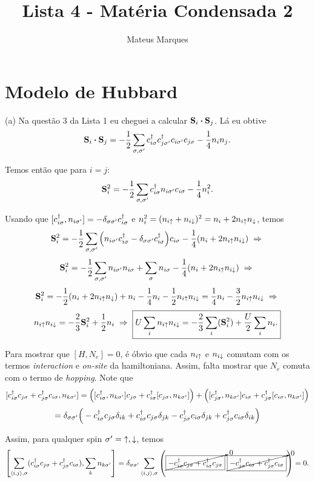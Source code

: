 \documentclass[a4paper,10pt]{article}
\title{\Huge{\textbf{Lista 4 - Matéria Condensada 2}}}
\author{Mateus Marques}
\begin{document}
\maketitle

\section{Modelo de Hubbard}

(a) Na questão 3 da Lista 1 eu cheguei a calcular $\S_i \vdot \S_j$. Lá eu obtive
$$
\S_i \vdot \S_j = -\frac{1}{2} \sum_{\s, \s'} c_{i\s}^\d c_{j\s'}^\d c_{i\s'} c_{j\s} - \frac{1}{4} n_i n_{j}.
$$

Temos então que para $i=j$:
$$
\vb{S}_i^2 = -\frac{1}{2} \sum_{\sigma,\sigma'} c_{i\sigma}^\dagger n_{i\sigma'} c_{i\sigma} - \frac{1}{4} n_i^2.
$$

Usando que $[c_{i\sigma}^\dagger, n_{i\sigma'}] = - \delta_{\sigma\sigma'} c_{i\sigma}^\dagger$ e $n_i^2 = (n_{i\uparrow} + n_{i\downarrow})^2 = n_i + 2 n_{i\uparrow} n_{\downarrow}$, temos
$$
\vb{S}_i^2 = -\frac{1}{2} \sum_{\sigma,\sigma'} \qty(n_{i\sigma'} c_{i\sigma}^\dagger - \delta_{\sigma\sigma'} c_{i\sigma}^\dagger ) c_{i\sigma} - \frac{1}{4} (n_i + 2 n_{i\uparrow} n_{i\downarrow}) \; \Rightarrow \;
$$
$$
\vb{S}_i^2 = -\frac{1}{2} \sum_{\sigma,\sigma'} n_{i\sigma'} n_{i\sigma} + \sum_{\sigma} n_{i\sigma} - \frac{1}{4} (n_i + 2 n_{i\uparrow} n_{i\downarrow}) \; \Rightarrow \;
$$
$$
\vb{S}_i^2 = -\frac{1}{2} (n_i + 2 n_{i\uparrow} n_{\downarrow}) + n_i - \frac{1}{4} n_i - \frac{1}{2} n_{i\uparrow} n_{i\downarrow} =
\frac{1}{4} n_i - \frac{3}{2} n_{i\uparrow} n_{i\downarrow} \; \Rightarrow \;
$$
$$
n_{i\uparrow} n_{i\downarrow} = -\frac{2}{3} \vb{S}_i^2 + \frac{1}{2} n_i \; \Rightarrow \;
\boxed{
U \sum_{i} n_{i\uparrow} n_{i\downarrow} =
-\frac{2}{3} \sum_{i} (\vb{S}_i^2) + \frac{U}{2} \sum_{i} n_i.
}
$$

Para mostrar que $[H, N_e] = 0$, é óbvio que cada $n_{i\uparrow}$ e $n_{i\downarrow}$ comutam com os termos \textit{interaction} e \textit{on-site} da hamiltoniana. Assim, falta mostrar que $N_e$ comuta com o termo de \textit{hopping}. Note que
$$
[c_{i\sigma}^\dagger c_{j\sigma} + c_{j\sigma}^\dagger c_{i\sigma}, n_{k\sigma'}] =
\Big([c_{i\sigma}^\dagger, n_{k\sigma'}] c_{j\sigma} + c_{i\sigma}^\dagger [c_{j\sigma}, n_{k\sigma'}]\Big) +
\Big([c_{j\sigma}^\dagger, n_{k\sigma'}] c_{i\sigma} + c_{j\sigma}^\dagger [c_{i\sigma}, n_{k\sigma'}]\Big)
$$
$$
=
\delta_{\sigma\sigma'} \Big(-c_{i\sigma}^\dagger c_{j\sigma} \delta_{ik} + c_{i\sigma}^\dagger c_{j\sigma} \delta_{jk} -
c_{j\sigma}^\dagger c_{i\sigma} \delta_{jk} + c_{j\sigma}^\dagger c_{i\sigma} \delta_{ik} \Big)
$$

Assim, para qualquer spin $\sigma' = \; \uparrow, \downarrow$, temos
$$
\qty[\sum_{\left\langle i , j \right\rangle, \sigma} (c_{i\sigma}^\dagger c_{j\sigma} + c_{j\sigma}^\dagger c_{i\sigma}),
\sum_{k} n_{k\sigma'} ] =
\delta_{\sigma\sigma'} \sum_{\left\langle i , j \right\rangle, \sigma}
\qty( \cancelto{0}{\boxed{-c_{i\sigma}^\dagger c_{j\sigma} + c_{i\sigma}^\dagger c_{j\sigma}}} \; \cancelto{0}{\boxed{- c_{j\sigma}^\dagger c_{i\sigma} + c_{j\sigma}^\dagger c_{i\sigma}}} ) = 0.
$$
\end{document}
